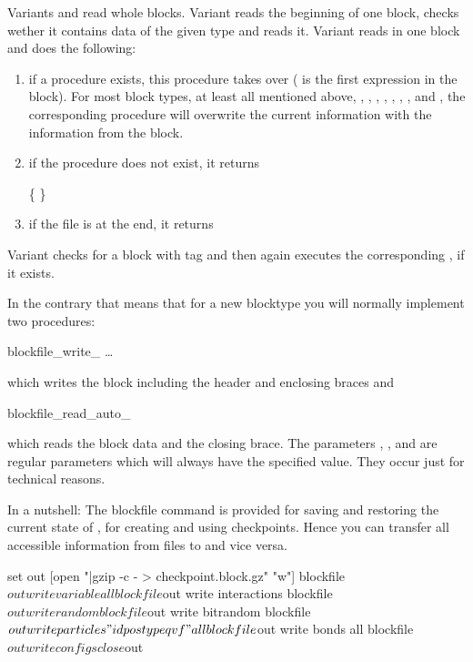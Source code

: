 Variants  and  read whole blocks.  Variant
 reads the beginning of one block, checks wether it
contains data of the given type and reads it. Variant 
reads in one block and does the following:
\begin{enumerate}
\item if a procedure  exists,
  this procedure takes over ( is the first expression in the
  block). For most block types, at least all mentioned above, \ie
  , , ,
  , , ,
  , and , the corresponding
  procedure will overwrite the current information with the
  information from the block.
\item if the procedure does not exist, it returns 
  \begin{code}
    \{   \}
  \end{code}
\item if the file is at the end, it returns 
\end{enumerate}

Variant  checks for a block with tag  and then
again executes the corresponding ,
if it exists.

In the contrary that means that for a new blocktype you will normally
implement two procedures:
\begin{essyntaxbox}
  blockfile_write_    \dots
\end{essyntaxbox}
which writes the block including the header and enclosing braces and
\begin{essyntaxbox}
  blockfile_read_auto_   
\end{essyntaxbox}
which reads the block data and the closing brace. The parameters
, ,  and  are regular
parameters which will always have the specified value. They occur just
for technical reasons.

In a nutshell: The blockfile command is provided for saving and
restoring the current state of \es, \eg for creating and using
checkpoints. Hence you can transfer all accessible information from
files to \es and vice versa.

\begin{tclcode}
set out [open "|gzip -c - > checkpoint.block.gz" "w"]
blockfile $out write variable all
blockfile $out write interactions
blockfile $out write random
blockfile $out write bitrandom
blockfile $out write particles "id pos type q v f" all
blockfile $out write bonds all
blockfile $out write configs
close $out 
\end{tclcode}

